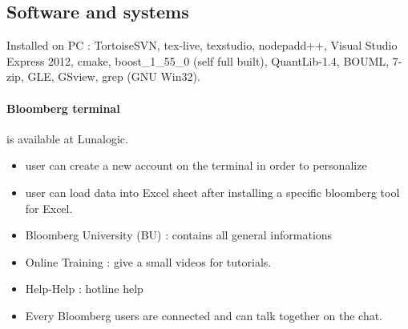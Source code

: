 \documentclass[a4paper,10pt]{article}
\begin{document}
\subsection{Software and systems}
Installed on PC : TortoiseSVN, tex-live, texstudio, nodepadd++, Visual Studio Express 2012, cmake, boost\_1\_55\_0 (self full built), QuantLib-1.4, BOUML, 7-zip, GLE, GSview, grep (GNU Win32). 
\paragraph{Bloomberg terminal} is available at Lunalogic.
\begin{itemize}	
	\item user can create a new account on the terminal in order to personalize
	\item user can load data into Excel sheet after installing a specific bloomberg tool for Excel. 
	\item Bloomberg University (BU) : contains all general informations
	\item Online Training : give a small videos for tutorials.
	\item Help-Help : hotline help
	\item Every Bloomberg users are connected and can talk together on the chat.
\end{itemize}

\newpage


\end{document}
